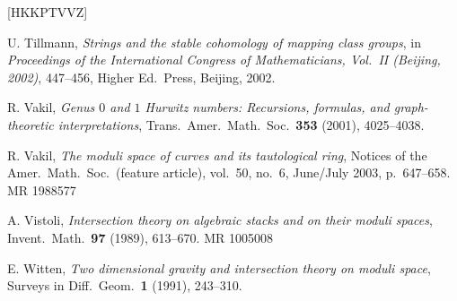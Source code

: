 \documentclass[12pt,letterpaper]{amsart}
\newcommand{\cited}{}
\begin{document}
\begin{thebibliography}{[HKKPTVVZ]}

 U. Tillmann, {\em Strings and the stable
    cohomology of mapping class groups}, in {\em Proceedings of the
    International Congress of Mathematicians, Vol.\ II (Beijing,
    2002)}, 447--456, Higher Ed.\ Press, Beijing, 2002. \cited

  R. Vakil, {\em Genus $0$ and $1$ Hurwitz numbers:
Recursions, formulas, and graph-theoretic interpretations},
Trans.\ Amer.\ Math.\ Soc.\ {\bf 353} (2001), 4025--4038. \cited

 R. Vakil, {\em The moduli space of curves and its
tautological ring}, Notices of the Amer.\ Math.\ Soc.\ (feature article),
vol.\ 50, no.\ 6, June/July 2003, p.\ 647--658. MR 1988577  \cited

 A. Vistoli, {\em Intersection theory on 
algebraic stacks and on their moduli spaces}, Invent.\ Math.\ {\bf 97} (1989),
613--670.  MR 1005008
\cited

 E. Witten, {\em Two dimensional gravity and
intersection theory on moduli space}, Surveys in Diff.\ Geom.\ {\bf 1}
(1991), 243--310.  \cited

\end{thebibliography}
\end{document}
